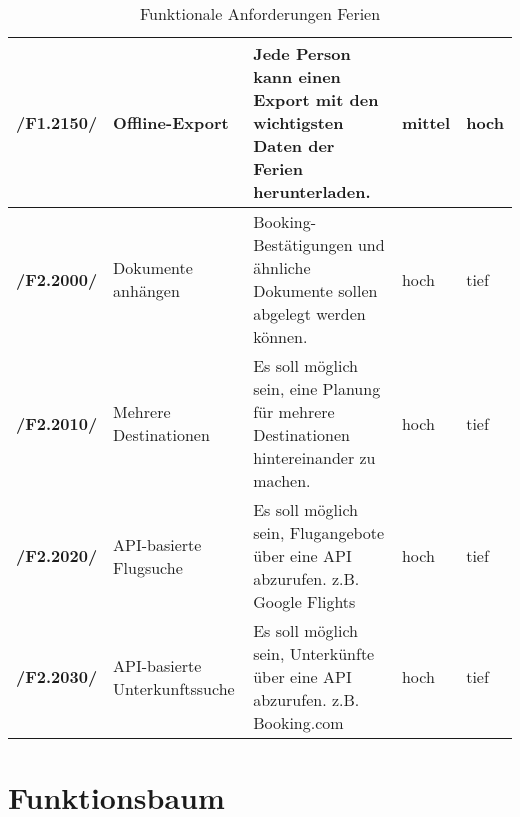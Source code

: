 \documentclass[10pt,a4paper,titlepage,twoside,german,final]{zhawreprt}
\newcommand{\AddRequirement}[2]{
\textbf{/#1#2/}
}
\newcommand{\F}[1]{
\AddRequirement{F1.}{#1}
}
\newcommand{\W}[1]{
\AddRequirement{F2.}{#1}
}
\numberwithin{table}{chapter}
\begin{document}
\begin{table}[ht]
\begin{tabular}{l|p{2.5cm}|p{5cm}|p{2cm}|p{1.5cm}}
\F{2150} & Offline-Export & Jede Person kann einen Export mit den wichtigsten Daten der Ferien herunterladen. & mittel & hoch\\\hline
\W{2000} & Dokumente anhängen & Booking-Bestätigungen und ähnliche Dokumente sollen abgelegt werden können. & hoch & tief\\\hline
\W{2010} & Mehrere Destinationen & Es soll möglich sein, eine Planung für mehrere Destinationen hintereinander zu machen. & hoch & tief\\\hline
\W{2020} & API-basierte Flugsuche & Es soll möglich sein, Flugangebote über eine API abzurufen. z.B. Google Flights & hoch & tief\\\hline
\W{2030} & API-basierte Unterkunftssuche & Es soll möglich sein, Unterkünfte über eine API abzurufen. z.B. Booking.com & hoch & tief\\\hline
\end{tabular}
\caption{Funktionale Anforderungen Ferien}\label{tbl:FuncVacation}
\end{table}\newpage

\chapter{Funktionsbaum}\label{chp:FunctionTree}
\begin{minipage}{\textwidth}

\end{minipage}
\end{document}
